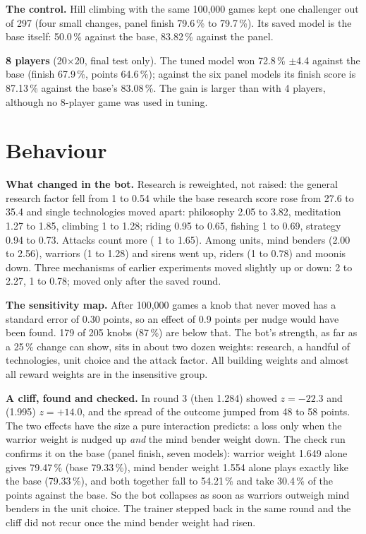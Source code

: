 \documentclass{../polyexp}
\begin{document}
\textbf{The control.} Hill climbing with the same 100,000 games kept one challenger out of 297 (four small changes, panel finish 79.6\,\% to 79.7\,\%). Its saved model is the base itself: 50.0\,\% against the base, 83.82\,\% against the panel.

\textbf{8 players} (20$\times$20, final test only). The tuned model won 72.8\,\% $\pm$4.4 against the base (finish 67.9\,\%, points 64.6\,\%); against the six panel models its finish score is 87.13\,\% against the base's 83.08\,\%. The gain is larger than with 4 players, although no 8-player game was used in tuning.

\section{Behaviour}
\textbf{What changed in the bot.} Research is reweighted, not raised: the general research factor  fell from 1 to 0.54 while the base research score  rose from 27.6 to 35.4 and single technologies moved apart: philosophy 2.05 to 3.82, meditation 1.27 to 1.85, climbing 1 to 1.28; riding 0.95 to 0.65, fishing 1 to 0.69, strategy 0.94 to 0.73. Attacks count more ( 1 to 1.65). Among units, mind benders (2.00 to 2.56), warriors (1 to 1.28) and sirens went up, riders (1 to 0.78) and moonis down. Three mechanisms of earlier experiments moved slightly up or down:  2 to 2.27,  1 to 0.78;  moved only after the saved round.

\textbf{The sensitivity map.} After 100,000 games a knob that never moved has a standard error of 0.30 points, so an effect of 0.9 points per nudge would have been found. 179 of 205 knobs (87\,\%) are below that. The bot's strength, as far as a 25\,\% change can show, sits in about two dozen weights: research, a handful of technologies, unit choice and the attack factor. All building weights and almost all reward weights are in the insensitive group.

\textbf{A cliff, found and checked.} In round 3  (then 1.284) showed $z=-22.3$ and  (1.995) $z=+14.0$, and the spread of the outcome jumped from 48 to 58 points. The two effects have the size a pure interaction predicts: a loss only when the warrior weight is nudged up \emph{and} the mind bender weight down. The check run confirms it on the base (panel finish, seven models): warrior weight 1.649 alone gives 79.47\,\% (base 79.33\,\%), mind bender weight 1.554 alone plays exactly like the base (79.33\,\%), and both together fall to 54.21\,\% and take 30.4\,\% of the points against the base. So the bot collapses as soon as warriors outweigh mind benders in the unit choice. The trainer stepped back in the same round and the cliff did not recur once the mind bender weight had risen.
\end{document}

